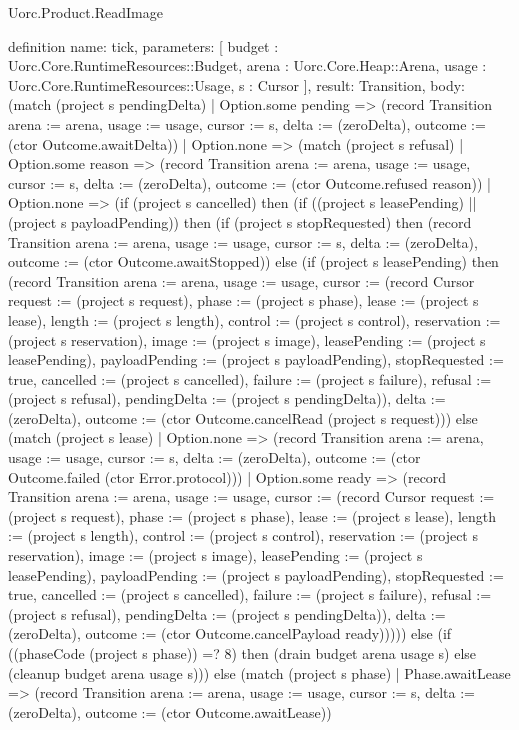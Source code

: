 \begin{lexlean}{Uorc.Product.ReadImage}
\begin{semanticmodule}
definition{
  name: tick,
  parameters: [
    budget : Uorc.Core.RuntimeResources::Budget,
    arena : Uorc.Core.Heap::Arena,
    usage : Uorc.Core.RuntimeResources::Usage,
    s : Cursor
  ],
  result: Transition,
  body: (match (project s pendingDelta)
    | Option.some pending => (record Transition {arena := arena, usage := usage, cursor := s, delta := (zeroDelta), outcome := (ctor Outcome.awaitDelta)})
    | Option.none => (match (project s refusal)
      | Option.some reason => (record Transition {arena := arena, usage := usage, cursor := s, delta := (zeroDelta), outcome := (ctor Outcome.refused reason)})
      | Option.none => (if (project s cancelled) then (if ((project s leasePending) || (project s payloadPending)) then (if (project s stopRequested) then (record Transition {arena := arena, usage := usage, cursor := s, delta := (zeroDelta), outcome := (ctor Outcome.awaitStopped)}) else (if (project s leasePending) then (record Transition {arena := arena, usage := usage, cursor := (record Cursor {request := (project s request), phase := (project s phase), lease := (project s lease), length := (project s length), control := (project s control), reservation := (project s reservation), image := (project s image), leasePending := (project s leasePending), payloadPending := (project s payloadPending), stopRequested := true, cancelled := (project s cancelled), failure := (project s failure), refusal := (project s refusal), pendingDelta := (project s pendingDelta)}), delta := (zeroDelta), outcome := (ctor Outcome.cancelRead (project s request))}) else (match (project s lease)
        | Option.none => (record Transition {arena := arena, usage := usage, cursor := s, delta := (zeroDelta), outcome := (ctor Outcome.failed (ctor Error.protocol))})
        | Option.some ready => (record Transition {arena := arena, usage := usage, cursor := (record Cursor {request := (project s request), phase := (project s phase), lease := (project s lease), length := (project s length), control := (project s control), reservation := (project s reservation), image := (project s image), leasePending := (project s leasePending), payloadPending := (project s payloadPending), stopRequested := true, cancelled := (project s cancelled), failure := (project s failure), refusal := (project s refusal), pendingDelta := (project s pendingDelta)}), delta := (zeroDelta), outcome := (ctor Outcome.cancelPayload ready)})))) else (if ((phaseCode (project s phase)) =? 8) then (drain budget arena usage s) else (cleanup budget arena usage s))) else (match (project s phase)
        | Phase.awaitLease => (record Transition {arena := arena, usage := usage, cursor := s, delta := (zeroDelta), outcome := (ctor Outcome.awaitLease)})
}
\end{semanticmodule}
\end{lexlean}
